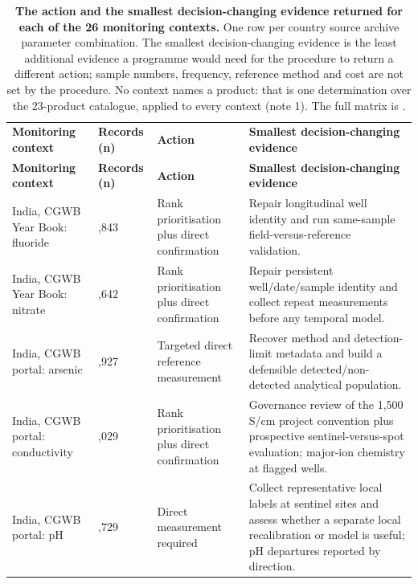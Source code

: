 \documentclass[10pt,letterpaper]{article}
\newlength\savedwidth
\newcommand\thickhline{\noalign{\global\savedwidth\arrayrulewidth\global\arrayrulewidth 2pt}%
\hline
\noalign{\global\arrayrulewidth\savedwidth}}
\begin{document}
\nolinenumbers
{\footnotesize\setlength{\tabcolsep}{3pt}\setlength{\LTcapwidth}{\linewidth}\captionsetup{font=normalsize}
\begin{longtable}{>{\raggedright\arraybackslash}p{1.55in}>{\raggedleft\arraybackslash}p{0.5in}>{\raggedright\arraybackslash}p{1.35in}>{\raggedright\arraybackslash}p{2.77in}}
\caption{\textbf{The action and the smallest decision-changing evidence returned for each of the 26 monitoring contexts.} One row per country \texttimes{} source archive \texttimes{} parameter combination. The smallest decision-changing evidence is the least additional evidence a programme would need for the procedure to return a different action; sample numbers, frequency, reference method and cost are not set by the procedure. No context names a product: that is one determination over the 23-product catalogue, applied to every context (note 1). The full matrix is .}\label{table1} \\
\hline
\textbf{Monitoring context} & \textbf{Records (n)} & \textbf{Action} & \textbf{Smallest decision-changing evidence} \\ \thickhline
\endfirsthead
\hline
\textbf{Monitoring context} & \textbf{Records (n)} & \textbf{Action} & \textbf{Smallest decision-changing evidence} \\ \thickhline
\endhead
India, CGWB Year Book: fluoride & 35,843 & Rank prioritisation plus direct confirmation & Repair longitudinal well identity and run same-sample field-versus-reference validation. \\ \hline
India, CGWB Year Book: nitrate & 34,642 & Rank prioritisation plus direct confirmation & Repair persistent well/date/sample identity and collect repeat measurements before any temporal model. \\ \hline
India, CGWB portal: arsenic & 9,927 & Targeted direct reference measurement & Recover method and detection-limit metadata and build a defensible detected/non-detected analytical population. \\ \hline
India, CGWB portal: conductivity & 173,029 & Rank prioritisation plus direct confirmation & Governance review of the 1,500 \textmu{}S/cm project convention plus prospective sentinel-versus-spot evaluation; major-ion chemistry at flagged wells. \\ \hline
India, CGWB portal: pH & 162,729 & Direct measurement required & Collect representative local labels at sentinel sites and assess whether a separate local recalibration or model is useful; pH departures reported by direction. \\ \hline

\end{longtable}}
\end{document}
